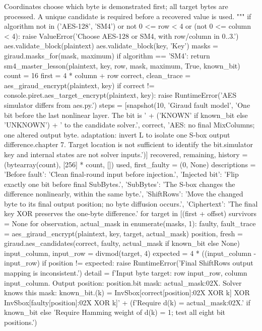 \begin{lightcode}[numbers=left,firstnumber=1]
    Coordinates choose which byte is demonstrated first; all target bytes are
    processed. A unique candidate is required before a recovered value is used.
    """
    if algorithm not in ('AES-128', 'SM4') or not 0 <= row < 4 or (not 0 <= column < 4):
        raise ValueError('Choose AES-128 or SM4, with row/column in 0..3.')
    aes.validate_block(plaintext)
    aes.validate_block(key, 'Key')
    masks = giraud.masks_for(mask, maximum)
    if algorithm == 'SM4':
        return sm4_master_lesson(plaintext, key, row, mask, maximum, True, known_bit)
    count = 16
    first = 4 * column + row
    correct, clean_trace = aes_giraud_encrypt(plaintext, key)
    if correct != console.piret.aes_target_encrypt(plaintext, key):
        raise RuntimeError('AES simulator differs from aes.py.')
    steps = [snapshot(10, 'Giraud fault model', 'One bit before the last nonlinear layer. The bit is ' + ('KNOWN' if known_bit else 'UNKNOWN') + ' to the candidate solver.', correct, 'AES: no final MixColumns; one altered output byte. adaptation: invert L to isolate one S-box output difference.\nPDF chapter 7. Target location is not sufficient to identify the bit.\nThe simulator key and internal states are not solver inputs.')]
    recovered, remaining, history = (bytearray(count), [256] * count, [])
    used, first_faulty = (0, None)
    descriptions = {'Before fault': 'Clean final-round input before injection.', 'Injected bit': 'Flip exactly one bit before final SubBytes.', 'SubBytes': 'The S-box changes the difference nonlinearly, within the same byte.', 'ShiftRows': 'Move the changed byte to its final output position; no byte diffusion occurs.', 'Ciphertext': 'The final key XOR preserves the one-byte difference.'}
    for target in [(first + offset) %
        survivors = None
        for observation, actual_mask in enumerate(masks, 1):
            faulty, fault_trace = aes_giraud_encrypt(plaintext, key, target, actual_mask)
            position, fresh = giraud.aes_candidates(correct, faulty, actual_mask if known_bit else None)
            input_column, input_row = divmod(target, 4)
            expected = 4 * ((input_column - input_row) %
            if position != expected:
                raise RuntimeError('Final ShiftRows output mapping is inconsistent.')
            detail = f'Input byte {target}: row {input_row}, column {input_column}. Output position: {position}.\nSimulator bit mask: {actual_mask:02X}. Solver knows this mask: {known_bit}.\nd(k) = InvSbox[{correct[position]:02X} XOR k] XOR InvSbox[{faulty[position]:02X} XOR k]\n' + (f'Require d(k) = {actual_mask:02X}.' if known_bit else 'Require Hamming weight of d(k) = 1; test all eight bit positions.')

\end{lightcode}
